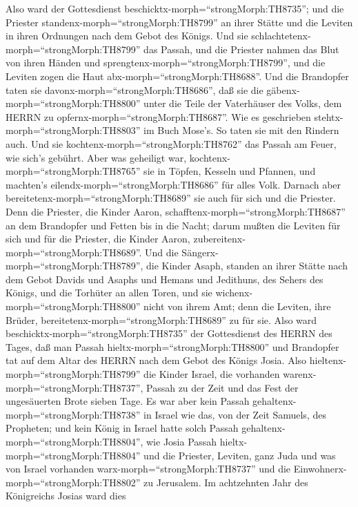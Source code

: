 Also ward der Gottesdienst beschicktx-morph=``strongMorph:TH8735''; und
die Priester standenx-morph=``strongMorph:TH8799'' an ihrer Stätte und
die Leviten in ihren Ordnungen nach dem Gebot des Königs. 
Und sie schlachtetenx-morph=``strongMorph:TH8799'' das Passah, und die
Priester nahmen das Blut von ihren Händen und
sprengtenx-morph=``strongMorph:TH8799'', und die Leviten zogen die Haut
abx-morph=``strongMorph:TH8688''.  Und die Brandopfer taten
sie davonx-morph=``strongMorph:TH8686'', daß sie die
gäbenx-morph=``strongMorph:TH8800'' unter die Teile der Vaterhäuser des
Volks, dem HERRN zu opfernx-morph=``strongMorph:TH8687''. Wie es
geschrieben stehtx-morph=``strongMorph:TH8803'' im Buch Mose's. So taten
sie mit den Rindern auch.  Und sie
kochtenx-morph=``strongMorph:TH8762'' das Passah am Feuer, wie sich's
gebührt. Aber was geheiligt war, kochtenx-morph=``strongMorph:TH8765''
sie in Töpfen, Kesseln und Pfannen, und machten's
eilendx-morph=``strongMorph:TH8686'' für alles Volk. 
Darnach aber bereitetenx-morph=``strongMorph:TH8689'' sie auch für sich
und die Priester. Denn die Priester, die Kinder Aaron,
schafftenx-morph=``strongMorph:TH8687'' an dem Brandopfer und Fetten bis
in die Nacht; darum mußten die Leviten für sich und für die Priester,
die Kinder Aaron, zubereitenx-morph=``strongMorph:TH8689''.
 Und die Sängerx-morph=``strongMorph:TH8789'', die Kinder
Asaph, standen an ihrer Stätte nach dem Gebot Davids und Asaphs und
Hemans und Jedithuns, des Sehers des Königs, und die Torhüter an allen
Toren, und sie wichenx-morph=``strongMorph:TH8800'' nicht von ihrem Amt;
denn die Leviten, ihre Brüder, bereitetenx-morph=``strongMorph:TH8689''
zu für sie.  Also ward
beschicktx-morph=``strongMorph:TH8735'' der Gottesdienst des HERRN des
Tages, daß man Passah hieltx-morph=``strongMorph:TH8800'' und Brandopfer
tat auf dem Altar des HERRN nach dem Gebot des Königs Josia.
 Also hieltenx-morph=``strongMorph:TH8799'' die Kinder
Israel, die vorhanden warenx-morph=``strongMorph:TH8737'', Passah zu der
Zeit und das Fest der ungesäuerten Brote sieben Tage.  Es
war aber kein Passah gehaltenx-morph=``strongMorph:TH8738'' in Israel
wie das, von der Zeit Samuels, des Propheten; und kein König in Israel
hatte solch Passah gehaltenx-morph=``strongMorph:TH8804'', wie Josia
Passah hieltx-morph=``strongMorph:TH8804'' und die Priester, Leviten,
ganz Juda und was von Israel vorhanden warx-morph=``strongMorph:TH8737''
und die Einwohnerx-morph=``strongMorph:TH8802'' zu Jerusalem.
 Im achtzehnten Jahr des Königreichs Josias ward dies
